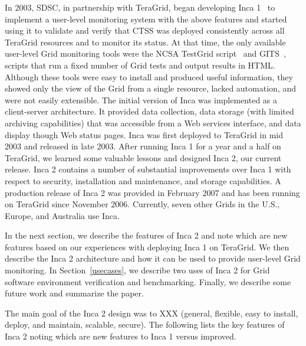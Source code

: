 \documentclass[times,10pt,twocolumn]{article}
\begin{document}
In 2003, SDSC, in partnership with TeraGrid, began developing Inca
1~\cite{inca1} to implement a user-level monitoring system with the above
features and started using it to validate and
verify that CTSS was deployed consistently across all TeraGrid resources and
to monitor its status.  At that time, the only available user-level Grid
monitoring tools were the NCSA TestGrid script~\cite{ncsa-test} and
GITS~\cite{gits}, scripts that run a fixed number of Grid tests and output
results in HTML.  Although these tools were easy to install and produced
useful information, they showed only the view of the Grid from a single
resource, lacked automation, and were not easily extensible.  The initial
version of Inca was implemented as a client-server architecture.  It provided
data collection, data storage (with limited archiving capabilities) that was
accessible from a Web services interface, and data display though Web status
pages.  Inca was first deployed to TeraGrid in mid 2003 and released in late
2003. After running Inca 1 for a year and a half on TeraGrid, we learned some
valuable lessons and designed Inca 2, our current release.  Inca 2
contains a number of substantial improvements over Inca 1 with respect to
security, installation and maintenance, and storage capabilities.  A
production release of Inca 2 was provided in February 2007 and has been
running on TeraGrid since November 2006.  Currently, seven other Grids in the
U.S., Europe, and Australia use Inca.  

In the next section, we describe the features of Inca 2 and note which
are new features based on our experiences with deploying Inca 1 on TeraGrid.
We then describe the Inca 2 architecture and how it can be used to provide
user-level Grid monitoring.  In Section~\ref{usecases}, we describe two 
uses of Inca 2 for Grid software environment verification and benchmarking.  
Finally, we describe some future work and summarize the paper.

  
The main goal of the Inca 2 design was to XXX (general, flexible, easy to
install, deploy, and
maintain, scalable, secure).
The following lists the key features of Inca 2 noting which are new features
to Inca 1 versus improved.
\end{document}
